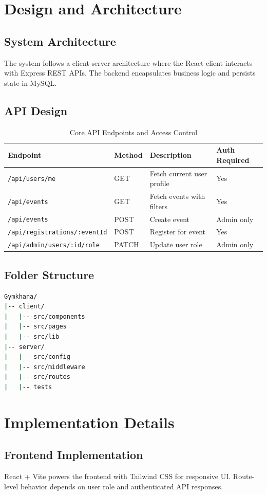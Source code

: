 \documentclass[12pt, a4paper]{article}
\begin{document}
\newpage
\section{Design and Architecture}
\subsection{System Architecture}
The system follows a client-server architecture where the React client interacts with Express REST APIs. The backend encapsulates business logic and persists state in MySQL.

\subsection{API Design}
\begin{table}[h!]
\centering
\begin{tabular}{@{}llll@{}}
\toprule
\textbf{Endpoint} & \textbf{Method} & \textbf{Description} & \textbf{Auth Required} \\ \midrule
\texttt{/api/users/me} & GET & Fetch current user profile & Yes \\
\texttt{/api/events} & GET & Fetch events with filters & Yes \\
\texttt{/api/events} & POST & Create event & Admin only \\
\texttt{/api/registrations/:eventId} & POST & Register for event & Yes \\
\texttt{/api/admin/users/:id/role} & PATCH & Update user role & Admin only \\ \bottomrule
\end{tabular}
\caption{Core API Endpoints and Access Control}
\end{table}

\subsection{Folder Structure}
\begin{lstlisting}[language=bash]
Gymkhana/
|-- client/
|   |-- src/components
|   |-- src/pages
|   |-- src/lib
|-- server/
|   |-- src/config
|   |-- src/middleware
|   |-- src/routes
|   |-- tests
\end{lstlisting}

\newpage
\section{Implementation Details}
\subsection{Frontend Implementation}
React + Vite powers the frontend with Tailwind CSS for responsive UI. Route-level behavior depends on user role and authenticated API responses.
\end{document}
